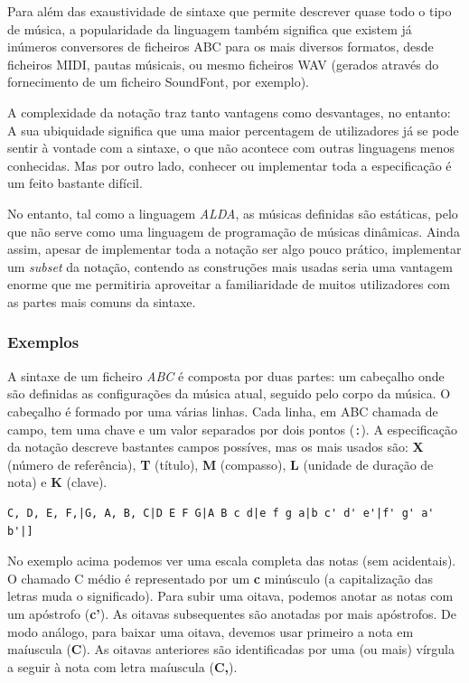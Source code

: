 \documentclass[
  oneside,
  11pt, a4paper,
  footinclude=true,
  headinclude=true,
  cleardoublepage=empty
]{scrbook}
\begin{document}
	Para além das exaustividade de sintaxe que permite descrever quase todo o tipo de música, a popularidade da linguagem também significa que existem já inúmeros conversores de ficheiros ABC para os mais diversos formatos, desde ficheiros MIDI, pautas músicais, ou mesmo ficheiros WAV (gerados através do fornecimento de um ficheiro SoundFont, por exemplo).
	
	A complexidade da notação traz tanto vantagens como desvantages, no entanto: A sua ubiquidade significa que uma maior percentagem de utilizadores já se pode sentir à vontade com a sintaxe, o que não acontece com outras linguagens menos conhecidas. Mas por outro lado, conhecer ou implementar toda a especificação \cite{abc-notation-standard} é um feito bastante difícil.
	
	No entanto, tal como a linguagem \textit{ALDA}, as músicas definidas são estáticas, pelo que não serve como uma linguagem de programação de músicas dinâmicas. Ainda assim, apesar de implementar toda a notação ser algo pouco prático, implementar um \textit{subset} da notação, contendo as construções mais usadas seria uma vantagem enorme que me permitiria aproveitar a familiaridade de muitos utilizadores com as partes mais comuns da sintaxe.
	
		\subsubsection{Exemplos}
	A sintaxe de um ficheiro \textit{ABC} é composta por duas partes: um cabeçalho onde são definidas as configurações da música atual, seguido pelo corpo da música. O cabeçalho é formado por uma várias linhas. Cada linha, em ABC chamada de campo, tem uma chave e um valor separados por dois pontos (\texttt{:}). A especificação da notação descreve bastantes campos possíves, mas os mais usados são: \textbf{X} (número de referência), \textbf{T} (título), \textbf{M} (compasso), \textbf{L} (unidade de duração de nota) e \textbf{K} (clave).
	
	\begin{lstlisting}[backgroundcolor=\color{transparent},caption={Exemplo da notação ABC},captionpos=b,xleftmargin=.1\textwidth]
	C, D, E, F,|G, A, B, C|D E F G|A B c d|e f g a|b c' d' e'|f' g' a' b'|]
	\end{lstlisting}
	
	No exemplo acima podemos ver uma escala completa das notas (sem acidentais). O chamado C médio é representado por um \textbf{c} minúsculo (a capitalização das letras muda o significado). Para subir uma oitava, podemos anotar as notas com um apóstrofo (\textbf{c'}). As oitavas subsequentes são anotadas por mais apóstrofos. De modo análogo, para baixar uma oitava, devemos usar primeiro a nota em maíuscula (\textbf{C}). As oitavas anteriores são identificadas por uma (ou mais) vírgula a seguir à nota com letra maíuscula (\textbf{C,}).
	
\end{document}
